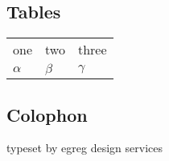 \documentclass{article}
\begin{document}
\subsection{Tables}



\begin{center}

\begin{tabular}{|l|l|l|}
\cline{1-3}
one & two & three\\
$\alpha$ & $\beta$ & $\gamma$\\
\cline{1-3}
\end{tabular}

\end{center}

\subsection{Colophon}
\raggedleft
typeset by egreg design services
\end{document}
